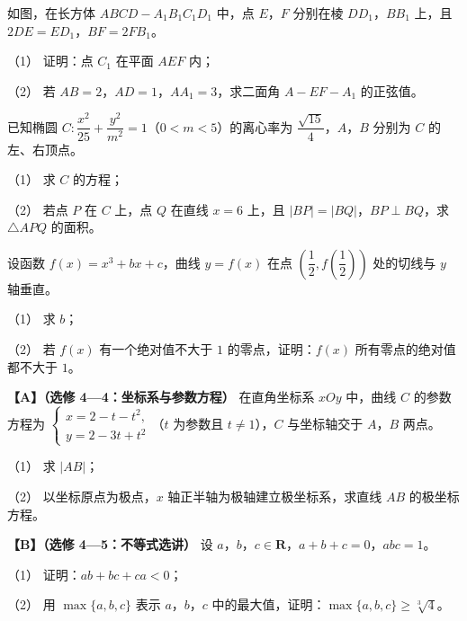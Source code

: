 \begin{question}
如图，在长方体 $ABCD-A_1B_1C_1D_1$ 中，点 $E$，$F$ 分别在棱 $DD_1$，$BB_1$ 上，且 $2DE=ED_1$，$BF=2FB_1$。

（1） 证明：点 $C_1$ 在平面 $AEF$ 内；

（2） 若 $AB=2$，$AD=1$，$AA_1=3$，求二面角 $A-EF-A_1$ 的正弦值。
\nopagebreak[4]
\begin{center}\end{center}
\nopagebreak[4]
\end{question}
\begin{question}
已知椭圆 $C:\dfrac{x^2}{25}+\dfrac{y^2}{m^2}=1$（$0<m<5$）的离心率为 $\dfrac{\sqrt{15}}4$，$A$，$B$ 分别为 $C$ 的左、右顶点。

（1） 求 $C$ 的方程；

（2） 若点 $P$ 在 $C$ 上，点 $Q$ 在直线 $x=6$ 上，且 $|BP|=|BQ|$，$BP\perp BQ$，求 $\triangle APQ$ 的面积。

\end{question}
\begin{question}
设函数 $f(x)=x^3+bx+c$，曲线 $y=f(x)$ 在点 $\left(\dfrac12,f\left(\dfrac12\right)\right)$ 处的切线与 $y$ 轴垂直。

（1） 求 $b$；

（2） 若 $f(x)$ 有一个绝对值不大于 $1$ 的零点，证明：$f(x)$ 所有零点的绝对值都不大于 $1$。

\end{question}
\begin{question}
\textbf{【A】（选修 4—4：坐标系与参数方程）} 在直角坐标系 $xOy$ 中，曲线 $C$ 的参数方程为 $\begin{cases}x=2-t-t^2,\\y=2-3t+t^2\end{cases}$（$t$ 为参数且 $t\neq1$），$C$ 与坐标轴交于 $A$，$B$ 两点。

（1） 求 $|AB|$；

（2） 以坐标原点为极点，$x$ 轴正半轴为极轴建立极坐标系，求直线 $AB$ 的极坐标方程。

\end{question}
\begin{question}
\textbf{【B】（选修 4—5：不等式选讲）} 设 $a$，$b$，$c\in\mathbf R$，$a+b+c=0$，$abc=1$。

（1） 证明：$ab+bc+ca<0$；

（2） 用 $\max\{a,b,c\}$ 表示 $a$，$b$，$c$ 中的最大值，证明：$\max\{a,b,c\}\geqslant\sqrt[3]4$。

\end{question}